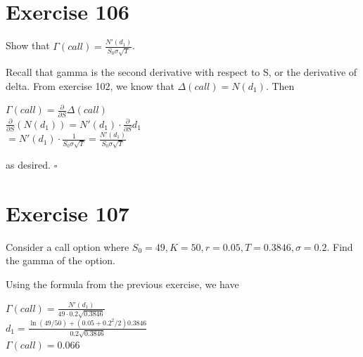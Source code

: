 \documentclass{article}
\begin{document}
\section*{Exercise 106}
Show that $\Gamma(call) = \frac{N'(d_1)}{S_0\sigma \sqrt{T}}$.
\begin{flushleft}
    Recall that gamma is the second derivative with respect to S, or the derivative of delta. From exercise 102, we know that $\Delta (call) = N(d_1)$. Then
    \begin{center}
        $\Gamma(call) = \frac{\partial}{\partial S} \Delta (call)$ \\
        $\frac{\partial}{\partial S} (N(d_1)) = N'(d_1) \cdot \frac{\partial}{\partial S}d_1$ \\
        $= N'(d_1) \cdot \frac{1}{S_0\sigma \sqrt{T}} = \frac{N'(d_1)}{S_0\sigma \sqrt{T}}$
    \end{center}
    as desired. $\square$
\end{flushleft}

\section*{Exercise 107}
Consider a call option where $S_0 = 49, K=50, r = 0.05, T = 0.3846, \sigma = 0.2$. Find the gamma of the option.
\begin{flushleft}
    Using the formula from the previous exercise, we have
    \begin{center}
        $\Gamma(call) = \frac{N'(d_1)}{49 \cdot 0.2 \sqrt{0.3846}}$ \\
        $d_1 = \frac{\ln(49/50) + (0.05 + 0.2^2/2)0.3846}{0.2 \sqrt{0.3846}}$ \\
        $\Gamma (call) = 0.066$
    \end{center}
\end{flushleft}
\end{document}
